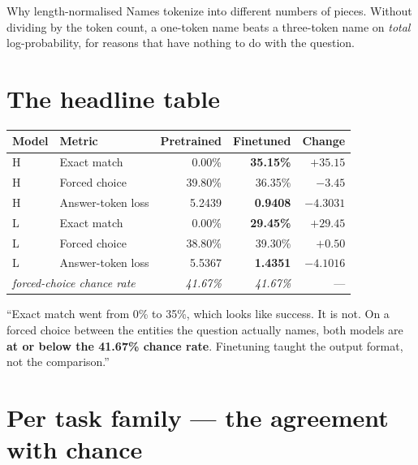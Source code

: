 \documentclass[11pt]{report}
\begin{document}
\begin{implementation}{Why length-normalised}
Names tokenize into different numbers of pieces. Without dividing by the token
count, a one-token name beats a three-token name on \emph{total}
log-probability, for reasons that have nothing to do with the question.
\end{implementation}

\section{The headline table}

\begin{center}
\begin{tabular}{@{}llrrr@{}}
\toprule
\textbf{Model} & \textbf{Metric} & \textbf{Pretrained} & \textbf{Finetuned} & \textbf{Change} \\
\midrule
H & Exact match & 0.00\% & \textbf{35.15\%} & $+35.15$ \\
H & Forced choice & 39.80\% & 36.35\% & $-3.45$ \\
H & Answer-token loss & 5.2439 & \textbf{0.9408} & $-4.3031$ \\
\midrule
L & Exact match & 0.00\% & \textbf{29.45\%} & $+29.45$ \\
L & Forced choice & 38.80\% & 39.30\% & $+0.50$ \\
L & Answer-token loss & 5.5367 & \textbf{1.4351} & $-4.1016$ \\
\midrule
\multicolumn{2}{l}{\emph{forced-choice chance rate}} & \emph{41.67\%} & \emph{41.67\%} & --- \\
\bottomrule
\end{tabular}
\end{center}

\begin{saybox}
``Exact match went from 0\% to 35\%, which looks like success. It is not. On a
forced choice between the entities the question actually names, both models are
\textbf{at or below the 41.67\% chance rate}. Finetuning taught the output
format, not the comparison.''
\end{saybox}

\section{Per task family --- the agreement with chance}
\end{document}
